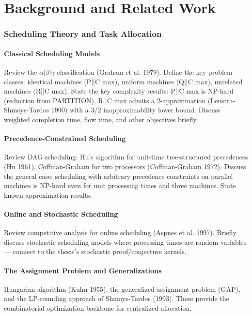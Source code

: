 \chapter{Background and Related Work}\label{chap:background}

\subsection{Scheduling Theory and Task Allocation}
\subsubsection{Classical Scheduling Models}

Review the $\alpha|\beta|\gamma$ classification (Graham et al. 1979). Define the key problem classes: identical machines (P||C max), uniform machines (Q||C max), unrelated machines (R||C max). State the key complexity results: P||C max is NP-hard (reduction from PARTITION), R||C max admits a 2-approximation (Lenstra-Shmoys-Tardos 1990) with a 3/2 inapproximability lower bound. Discuss weighted completion time, flow time, and other objectives briefly.

\subsubsection{Precedence-Constrained Scheduling}
Review DAG scheduling: Hu's algorithm for unit-time tree-structured precedences (Hu 1961), Coffman-Graham for two processors (Coffman-Graham 1972). Discuss the general case: scheduling with arbitrary precedence constraints on parallel machines is NP-hard even for unit processing times and three machines. State known approximation results.

\subsubsection{Online and Stochastic Scheduling}
Review competitive analysis for online scheduling (Aspnes et al. 1997). Briefly discuss stochastic scheduling models where processing times are random variables — connect to the thesis's stochastic proof/conjecture kernels.

\subsubsection{The Assignment Problem and Generalizations}
Hungarian algorithm (Kuhn 1955), the generalized assignment problem (GAP), and the LP-rounding approach of Shmoys-Tardos (1993). These provide the combinatorial optimization backbone for centralized allocation.

